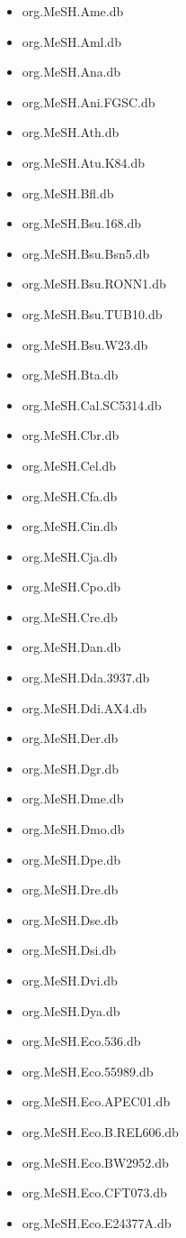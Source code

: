 \documentclass[margin,line,10pt]{res}
\newenvironment{list1}{
  \begin{list}{\ding{113}}{%
      \setlength{\itemsep}{0in}
      \setlength{\parsep}{0in} \setlength{\parskip}{0in}
      \setlength{\topsep}{0in} \setlength{\partopsep}{0in} 
      \setlength{\leftmargin}{0.17in}}}{\end{list}}
\begin{document}
\begin{resume}
\begin{list1}
\begin{multicols}{2}
\begin{itemize}
\item org.MeSH.Ame.db
\item org.MeSH.Aml.db
\item org.MeSH.Ana.db
\item org.MeSH.Ani.FGSC.db
\item org.MeSH.Ath.db
\item org.MeSH.Atu.K84.db
\item org.MeSH.Bfl.db
\item org.MeSH.Bsu.168.db
\item org.MeSH.Bsu.Bsn5.db 
\item org.MeSH.Bsu.RONN1.db
\item org.MeSH.Bsu.TUB10.db
\item org.MeSH.Bsu.W23.db  
\item org.MeSH.Bta.db 
\item org.MeSH.Cal.SC5314.db
\item org.MeSH.Cbr.db 
\item org.MeSH.Cel.db
\item org.MeSH.Cfa.db
\item org.MeSH.Cin.db
\item org.MeSH.Cja.db
\item org.MeSH.Cpo.db
\item org.MeSH.Cre.db  
\item org.MeSH.Dan.db
\item org.MeSH.Dda.3937.db
\item org.MeSH.Ddi.AX4.db
\item org.MeSH.Der.db 
\item org.MeSH.Dgr.db 
\item org.MeSH.Dme.db 
\item org.MeSH.Dmo.db 
\item org.MeSH.Dpe.db
\item org.MeSH.Dre.db
\item org.MeSH.Dse.db
\item org.MeSH.Dsi.db
\item org.MeSH.Dvi.db  
\item org.MeSH.Dya.db
\item org.MeSH.Eco.536.db    
\item org.MeSH.Eco.55989.db
\item org.MeSH.Eco.APEC01.db 
\item org.MeSH.Eco.B.REL606.db
\item org.MeSH.Eco.BW2952.db 
\item org.MeSH.Eco.CFT073.db
\item org.MeSH.Eco.E24377A.db   

\end{itemize}
\end{multicols}
\end{list1}
\end{resume}
\end{document}
